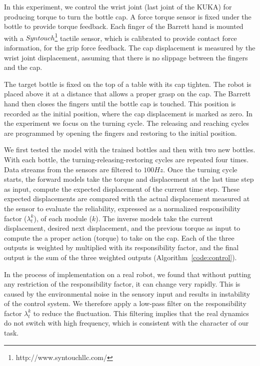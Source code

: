 In this experiment, we control the wrist joint (last joint of the KUKA)
for producing torque to turn the bottle cap. A force torque sensor is
fixed under the bottle to provide torque feedback. Each finger of the
Barrett hand is mounted with a
$Syntouch$\footnote{http://www.syntouchllc.com/} tactile sensor, which
is calibrated to provide contact force information, for the grip force
feedback. The cap displacement is measured by the wrist joint
displacement, assuming that there is no slippage between the fingers and
the cap.

The target bottle is fixed on the top of a table with its cap
tighten. The robot is placed above it at a distance that allows a
proper grasp on the cap. The Barrett hand then closes the fingers until
the bottle cap is touched. This position is recorded as the initial
position, where the cap displacement is marked as zero. In the
experiment we focus on the turning cycle. The releasing and reaching
cycles are programmed by opening the fingers and restoring to the
initial position.

We first tested the model with the trained bottles and then with two
new bottles. With each bottle, the turning-releasing-restoring cycles
are repeated four times. Data streams from the sensors are filtered to
$100Hz$. Once the turning cycle starts, the forward models take the
torque and displacement at the last time step as input, compute the
expected displacement of the current time step. These expected
displacements are compared with the actual displacement measured at
the sensor to evaluate the reliability, expressed as a normalized
responsibility factor ($\lambda_t^k$), of each module ($k$). The inverse models
take the current displacement, desired next displacement, and the
previous torque as input to compute the a proper action
(torque) to take on the cap. Each of the three outputs is weighted by
multiplied with its responsibility factor, and the final output is the sum of the three weighted outputs (Algorithm~\ref{code:control}).

In the process of implementation on a real robot, we found that
without putting any restriction of the responsibility factor, it can
change very rapidly. This is caused by the environmental noise in the
sensory input and results in instability of the control system. We
therefore apply a low-pass filter on the responsibility factor
$\lambda_t^k$ to reduce the fluctuation. This filtering implies that
the real dynamics do not switch with high frequency, which is consistent
with the character of our task. %

